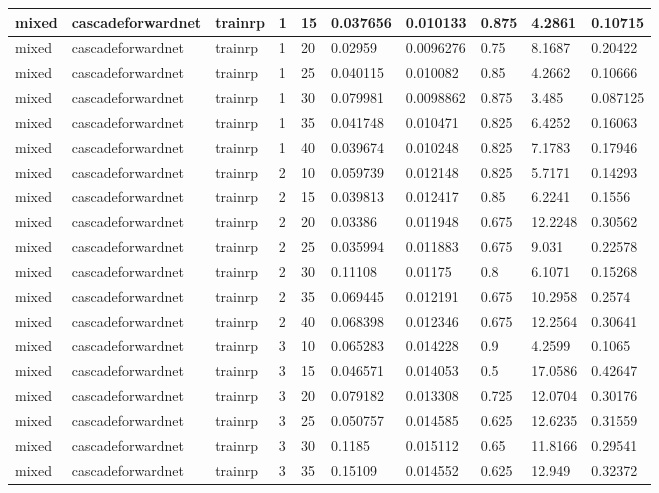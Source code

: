 \begin{longtable}{lllllllll}
mixed & cascadeforwardnet & trainrp & 1 & 15 & 0.037656 & 0.010133 & 0.875 & 4.2861 & 0.10715 \\ \hline 
mixed & cascadeforwardnet & trainrp & 1 & 20 & 0.02959 & 0.0096276 & 0.75 & 8.1687 & 0.20422 \\ \hline 
mixed & cascadeforwardnet & trainrp & 1 & 25 & 0.040115 & 0.010082 & 0.85 & 4.2662 & 0.10666 \\ \hline 
mixed & cascadeforwardnet & trainrp & 1 & 30 & 0.079981 & 0.0098862 & 0.875 & 3.485 & 0.087125 \\ \hline 
mixed & cascadeforwardnet & trainrp & 1 & 35 & 0.041748 & 0.010471 & 0.825 & 6.4252 & 0.16063 \\ \hline 
mixed & cascadeforwardnet & trainrp & 1 & 40 & 0.039674 & 0.010248 & 0.825 & 7.1783 & 0.17946 \\ \hline 
mixed & cascadeforwardnet & trainrp & 2 & 10 & 0.059739 & 0.012148 & 0.825 & 5.7171 & 0.14293 \\ \hline 
mixed & cascadeforwardnet & trainrp & 2 & 15 & 0.039813 & 0.012417 & 0.85 & 6.2241 & 0.1556 \\ \hline 
mixed & cascadeforwardnet & trainrp & 2 & 20 & 0.03386 & 0.011948 & 0.675 & 12.2248 & 0.30562 \\ \hline 
mixed & cascadeforwardnet & trainrp & 2 & 25 & 0.035994 & 0.011883 & 0.675 & 9.031 & 0.22578 \\ \hline 
mixed & cascadeforwardnet & trainrp & 2 & 30 & 0.11108 & 0.01175 & 0.8 & 6.1071 & 0.15268 \\ \hline 
mixed & cascadeforwardnet & trainrp & 2 & 35 & 0.069445 & 0.012191 & 0.675 & 10.2958 & 0.2574 \\ \hline 
mixed & cascadeforwardnet & trainrp & 2 & 40 & 0.068398 & 0.012346 & 0.675 & 12.2564 & 0.30641 \\ \hline 
mixed & cascadeforwardnet & trainrp & 3 & 10 & 0.065283 & 0.014228 & 0.9 & 4.2599 & 0.1065 \\ \hline 
mixed & cascadeforwardnet & trainrp & 3 & 15 & 0.046571 & 0.014053 & 0.5 & 17.0586 & 0.42647 \\ \hline 
mixed & cascadeforwardnet & trainrp & 3 & 20 & 0.079182 & 0.013308 & 0.725 & 12.0704 & 0.30176 \\ \hline 
mixed & cascadeforwardnet & trainrp & 3 & 25 & 0.050757 & 0.014585 & 0.625 & 12.6235 & 0.31559 \\ \hline 
mixed & cascadeforwardnet & trainrp & 3 & 30 & 0.1185 & 0.015112 & 0.65 & 11.8166 & 0.29541 \\ \hline 
mixed & cascadeforwardnet & trainrp & 3 & 35 & 0.15109 & 0.014552 & 0.625 & 12.949 & 0.32372 \\ \hline 

\end{longtable}
